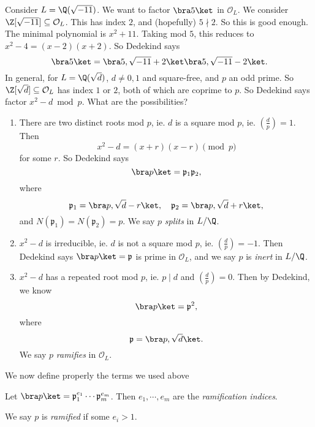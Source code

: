 \documentclass[a4paper]{article}
\begin{document}
\begin{eg}
  Consider $L = \Q(\sqrt{-11})$. We want to factor $\bra 5\ket$ in $\mathcal{O}_L$. We consider $\Z[\sqrt{-11}] \subseteq \mathcal{O}_L$. This has index $2$, and (hopefully) $5\nmid 2$. So this is good enough. The minimal polynomial is $x^2 + 11$. Taking mod $5$, this reduces to $x^2 - 4 = (x - 2)(x + 2)$. So Dedekind says
  \[
    \bra 5\ket = \bra 5, \sqrt{-11} + 2\ket\bra 5, \sqrt{-11} - 2\ket.
  \]
  In general, for $L = \Q(\sqrt{d})$, $d \not= 0, 1$ and square-free, and $p$ an odd prime. So $\Z[\sqrt{d}] \subseteq \mathcal{O}_L$ has index $1$ or $2$, both of which are coprime to $p$. So Dedekind says factor $x^2 - d \bmod p$. What are the possibilities?
  \begin{enumerate}
    \item There are two distinct roots mod $p$, ie. $d$ is a square mod $p$, ie. $\left(\frac{d}{p}\right) = 1$. Then
      \[
        x^2 - d = (x + r)(x - r)\pmod p
      \]
      for some $r$. So Dedekind says
      \[
        \bra p\ket = \mathfrak{p}_1 \mathfrak{p}_2,
      \]
      where
      \[
        \mathfrak{p}_1 = \bra p, \sqrt{d} - r\ket,\quad \mathfrak{p}_2 = \bra p, \sqrt{d} + r\ket,
      \]
      and $N(\mathfrak{p}_1) = N(\mathfrak{p}_2) = p$. We say $p$ \emph{splits} in $L/\Q$.
    \item $x^2 - d$ is irreducible, ie. $d$ is not a square mod $p$, ie. $\left(\frac{d}{p}\right) = -1$. Then Dedekind says $\bra p \ket = \mathfrak{p}$ is prime in $\mathcal{O}_L$, and we say $p$ is \emph{inert} in $L/\Q$.
    \item $x^2 - d$ has a repeated root mod $p$, ie. $p \mid d$ and $\left(\frac{d}{p}\right) = 0$. Then by Dedekind, we know
      \[
        \bra p\ket = \mathfrak{p}^2,
      \]
      where
      \[
        \mathfrak{p} = \bra p, \sqrt{d}\ket.
      \]
      We say $p$ \emph{ramifies} in $\mathcal{O}_L$.
  \end{enumerate}
\end{eg}

We now define properly the terms we used above
\begin{defi}
  Let $\bra p\ket = \mathfrak{p}_1^{e_1} \cdots \mathfrak{p}_m^{e_m}$. Then $e_1, \cdots, e_m$ are the \emph{ramification indices}.
\end{defi}

\begin{defi}
  We say $p$ is \emph{ramified} if some $e_i > 1$.
\end{defi}
\end{document}
